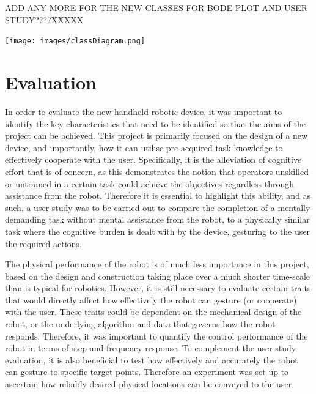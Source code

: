 \documentclass[11pt]{article}
\begin{document}
ADD ANY MORE FOR THE NEW CLASSES FOR BODE PLOT AND USER STUDY????XXXXX

\begin{landscape}

\begin{center}
\texttt{[image: images/classDiagram.png]}
\label{figure:classDiagram}
\end{center}


\end{landscape}



\section{Evaluation}

In order to evaluate the new handheld robotic device, it was important to identify the key characteristics that need to be identified so that the aims of the project can be achieved. This project is primarily focused on the design of a new device, and importantly, how it can utilise pre-acquired task knowledge to effectively cooperate with the user. Specifically, it is the alleviation of cognitive effort that is of concern, as this demonstrates the notion that operators unskilled or untrained in a certain task could achieve the objectives regardless through assistance from the robot. Therefore it is essential to highlight this ability, and as such, a user study was to be carried out to compare the completion of a mentally demanding task without mental assistance from the robot, to a physically similar task where the cognitive burden is dealt with by the device, gesturing to the user the required actions.

The physical performance of the robot is of much less importance in this project, based on the design and construction taking place over a much shorter time-scale than is typical for robotics. However, it is still necessary to evaluate certain traits that would directly affect how effectively the robot can gesture (or cooperate) with the user. These traits could be dependent on the mechanical design of the robot, or the underlying algorithm and data that governs how the robot responds. Therefore, it was important to quantify the control performance of the robot in terms of step and frequency response. To complement the user study evaluation, it is also beneficial to test how effectively and accurately the robot can gesture to specific target points. Therefore an experiment was set up to ascertain how reliably desired physical locations can be conveyed to the user. 
\end{document}
